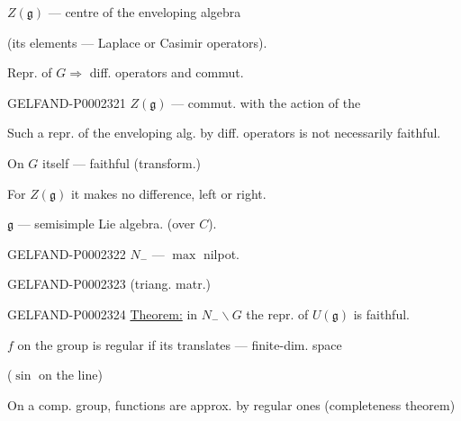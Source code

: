 $Z (\mathfrak g)$ — centre of the enveloping algebra

(its elements — Laplace or Casimir operators).



Repr. of $G\Rightarrow$ diff. operators and commut.



\begin{GelfandAdjacentEvidence}{GELFAND-P000232}{1}
$Z (\mathfrak g)$ — commut. with the action of the 
\end{GelfandAdjacentEvidence}


Such a repr. of the enveloping alg. by diff. operators is not necessarily faithful.



On $G$ itself — faithful (transform.)



For $Z (\mathfrak g)$ it makes no difference, left or right.



$\mathfrak g$ — semisimple Lie algebra. (over $C$).



\begin{GelfandAdjacentEvidence}{GELFAND-P000232}{2}
$N_-$ — $\max$ nilpot. 
\end{GelfandAdjacentEvidence}
\begin{GelfandAdjacentEvidence}{GELFAND-P000232}{3}
 (triang. matr.)

\end{GelfandAdjacentEvidence}


\begin{GelfandAdjacentEvidence}{GELFAND-P000232}{4}
\underline{Theorem:} in $N_-\backslash G$ the repr. of $U (\mathfrak g)$ is faithful.



\end{GelfandAdjacentEvidence}


$f$ on the group is regular if its translates — finite-dim. space

($\sin$ on the line)



On a comp. group, functions are approx. by regular ones (completeness theorem)



